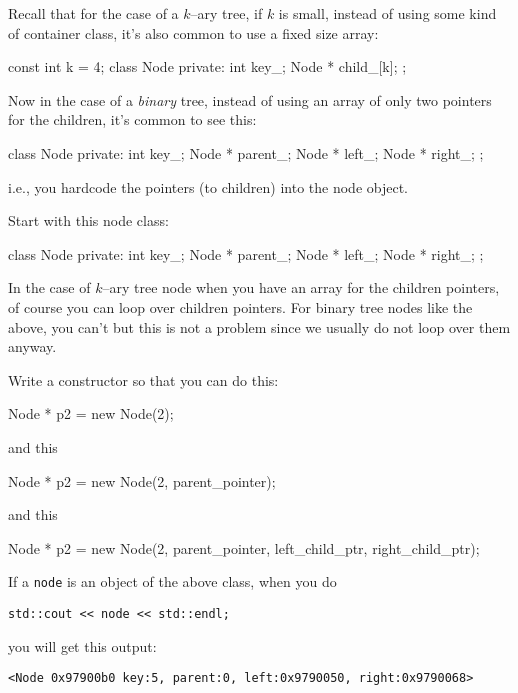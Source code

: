 Recall that for the case of a $k$--ary tree,
if $k$ is small,
instead of using some kind of container class, 
it's also common to use a fixed size array:
\begin{console}
const int k = 4;
class Node 
{
private:
    int key_;
    Node * child_[k];
};
\end{console}
Now in the case of a \textit{binary} tree,
instead of using an array of only two pointers for the children, 
it's common to see this:
\begin{console}
class Node 
{
private:
    int key_;
    Node * parent_;
    Node * left_;
    Node * right_;
};
\end{console}
i.e., you hardcode the pointers (to children) into the node object.

\begin{ex}
Start with this node class:
\begin{console}
class Node
{
private:
    int key_;
    Node * parent_;
    Node * left_;
    Node * right_;
};
\end{console}

In the case of $k$--ary tree node when you have an array for the children pointers,
of course you can loop over children pointers.
For binary tree nodes like the above, you can't but this is not a problem
since we usually do not loop over them anyway.

\end{ex}
Write a constructor so that you can do this:
\begin{console}
Node * p2 = new Node(2);
\end{console}
and this
\begin{console}
Node * p2 = new Node(2, parent_pointer);
\end{console}
and this
\begin{console}
Node * p2 = new Node(2, parent_pointer,
                     left_child_ptr, right_child_ptr);
\end{console}

\begin{comment}
It should look like this:
\begin{console}
...
    Node(int key=0,
         Node * parent=NULL,
         Node * left=NULL, Node * right=NULL)
        : key_(key),
          parent_(parent),
          left_(left), right_(right)
    {}
...
\end{console}
\end{comment}
If a \verb!node! is an object of the above class, 
when you do
\begin{Verbatim}[commandchars=\\\{\},frame=single]
std::cout << node << std::endl;
\end{Verbatim}
you will get this output:
{\small
\begin{Verbatim}[frame=single, commandchars=\\\{\}]
<Node 0x97900b0 key:5, parent:0, left:0x9790050, right:0x9790068>
\end{Verbatim}
}




